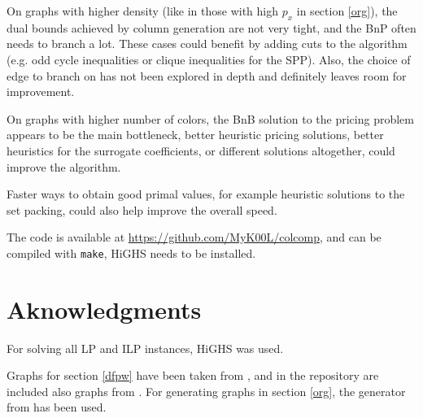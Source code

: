 \documentclass{article}
\begin{document}
On graphs with higher density (like in those with high $p_x$ in section \ref{org}),
the dual bounds achieved by column generation are not very tight,
and the BnP often needs to branch a lot.
These cases could benefit by adding cuts to the algorithm (e.g. odd cycle inequalities or clique inequalities for the SPP).
Also, the choice of edge to branch on has not been explored in depth and definitely leaves room for improvement.

On graphs with higher number of colors,
the BnB solution to the pricing problem appears to be the main bottleneck,
better heuristic pricing solutions,
better heuristics for the surrogate coefficients,
or different solutions altogether, could improve the algorithm.

Faster ways to obtain good primal values,
for example heuristic solutions to the set packing,
could also help improve the overall speed.

The code is available at \url{https://github.com/MyK00L/colcomp}, and can be compiled with \texttt{make}, HiGHS needs to be installed.

\section{Aknowledgments}

For solving all LP and ILP instances, HiGHS \parencite{highs} was used.

Graphs for section \ref{dfpw} have been taken from \parencite{ccc2025}, and in the repository are included also graphs from \parencite{mop2012}.
For generating graphs in section \ref{org}, the generator from \parencite{mop2013} has been used.

\printbibliography
\end{document}
